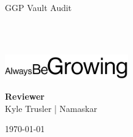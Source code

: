 \begin{titlepage}
  \vbox{}
  \vbox{}

  \begin{center}


    \noindent\makebox[\linewidth]{\rule{.7\paperwidth}{.6pt}}\\[0.7cm]

    { \huge \bfseries

      GGP Vault Audit
    }\\[0.25cm]
    
    \noindent\makebox[\linewidth]{\rule{.7\paperwidth}{.6pt}}\\[0.7cm]

    \vfill

    \includegraphics[width=0.40\textwidth]{img/abg_wordmark.png}

    
    \large
    {\bfseries Reviewer}\\
    
    Kyle Trusler | Namaskar

    {\large \today}

  \end{center}

\end{titlepage}